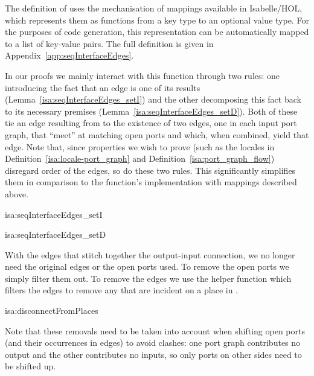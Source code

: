 \documentclass[class=smolathesis,crop=false]{standalone}
\begin{document}
The definition of  uses the mechanisation of mappings available in Isabelle/HOL, which represents them as functions from a key type to an optional value type.
For the purposes of code generation, this representation can be automatically mapped to a list of key-value pairs.
The full definition is given in Appendix~\ref{app:seqInterfaceEdges}.

\cbstart
In our proofs we mainly interact with this function through two rules: one introducing the fact that an edge is one of its results (Lemma~\ref{isa:seqInterfaceEdges_setI}) and the other decomposing this fact back to its necessary premises (Lemma~\ref{isa:seqInterfaceEdges_setD}).
Both of these tie an edge resulting from  to the existence of two edges, one in each input port graph, that ``meet'' at matching open ports and which, when combined, yield that edge.
Note that, since properties we wish to prove (such as the locales in Definition~\ref{isa:locale-port_graph} and Definition~\ref{isa:port_graph_flow}) disregard order of the edges, so do these two rules.
This significantly simplifies them in comparison to the function's implementation with mappings described above.
\cbend

\begin{isalemma}{isa:seqInterfaceEdges_setI}
  
\end{isalemma}
\pagebreak
\begin{isalemma}{isa:seqInterfaceEdges_setD}
  
\end{isalemma}

With the edges that stitch together the output-input connection, we no longer need the original edges or the open ports used.
To remove the open ports we simply filter them out.
To remove the edges we use the helper function  which filters the edges  to remove any that are incident on a place in .

\begin{isadef}{isa:disconnectFromPlaces}
  
\end{isadef}

Note that these removals need to be taken into account when shifting open ports (and their occurrences in edges) to avoid clashes: one port graph contributes no output and the other contributes no inputs, so only ports on other sides need to be shifted up.
\end{document}
